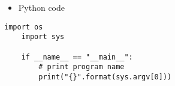 \documentclass[xcolor=dvipsnames,compress,10pt]{nersc}
\begin{document}
\begin{frame}[fragile]
\vfill

\begin{itemize}
    \item Python code
\end{itemize}

\begin{lstlisting}[style=custompy]
    import os
    import sys

    if __name__ == "__main__":
        # print program name
        print("{}".format(sys.argv[0]))
\end{lstlisting}

\vfill

\end{frame}

%
%
\end{document}
